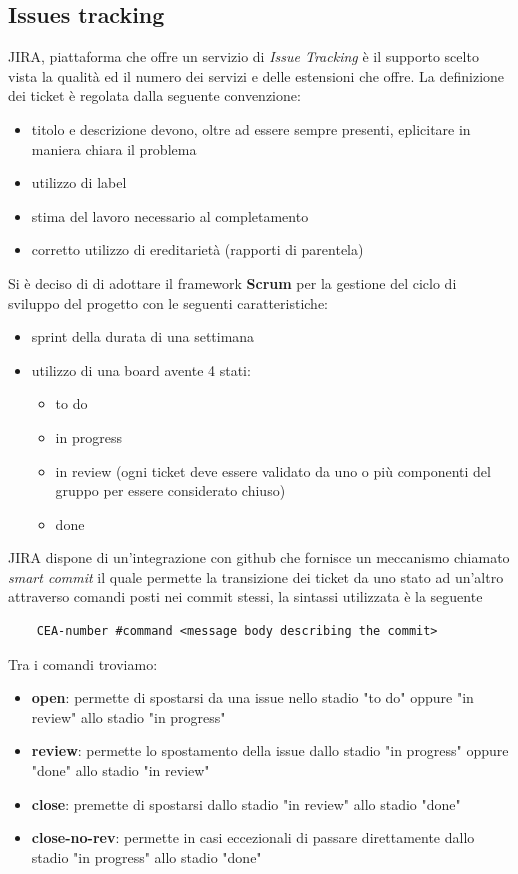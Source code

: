 	\subsection{Issues tracking}
	JIRA, piattaforma che offre un servizio di \textit{Issue Tracking} è il supporto scelto vista la qualità ed il numero dei servizi e delle estensioni che offre.
	\newline
	La definizione dei ticket è regolata dalla seguente convenzione:
	\begin{itemize}
		\item titolo e descrizione devono, oltre ad essere sempre presenti, eplicitare in maniera chiara il problema
		\item utilizzo di label
		\item stima del lavoro necessario al completamento
		\item corretto utilizzo di ereditarietà (rapporti di parentela)
	\end{itemize}
	Si è deciso di di adottare il framework \textbf{Scrum} per la gestione del ciclo di sviluppo del progetto con le seguenti caratteristiche:
	\begin{itemize}
		\item sprint della durata di una settimana
		\item utilizzo di una board avente 4 stati:
		\begin{itemize}
			\item to do
			\item in progress
			\item in review (ogni ticket deve essere validato da uno o più componenti del gruppo per essere considerato chiuso)
			\item done
		\end{itemize}
	\end{itemize}

	JIRA dispone di un'integrazione con github che fornisce un meccanismo chiamato \textit{smart commit} il quale permette la transizione dei ticket da uno stato ad un'altro attraverso comandi posti nei commit stessi, la sintassi utilizzata è la seguente
	\begin{lstlisting}
	CEA-number #command <message body describing the commit>
	\end{lstlisting}
	Tra i comandi troviamo:
	\begin{itemize}
		\item \textbf{open}: permette di spostarsi da una issue nello stadio "to do" oppure "in review" allo stadio "in progress"
		\item \textbf{review}: permette lo spostamento della issue dallo stadio "in progress" oppure "done" allo stadio "in review"
		\item \textbf{close}: premette di spostarsi dallo stadio "in review" allo stadio "done"
		\item \textbf{close-no-rev}: permette in casi eccezionali di passare direttamente dallo stadio "in progress" allo stadio "done"
	\end{itemize}
